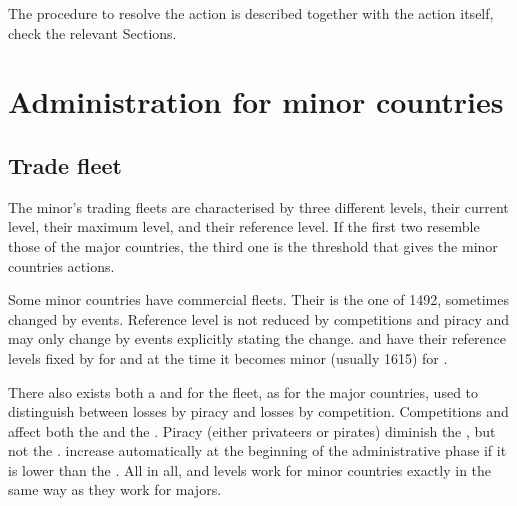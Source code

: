\aparag The procedure to resolve the action is described together with the
action itself, check the relevant Sections.

\section{Administration for minor countries}

\label{chAdministration:Administration Minor}



\subsection{Trade fleet}\label{chAdministration:Minor Commercial Fleets}

\begin{note}
  The minor's trading fleets are characterised by three different levels,
  their current level, their maximum level, and their reference level. If the
  first two resemble those of the major countries, the third one is the
  threshold that gives the minor countries \TFI actions.
\end{note}

 Some minor countries have commercial
fleets. Their  is the one of 1492, sometimes changed by
events. Reference level is not reduced by competitions and piracy and may only
change by events explicitly stating the change.
\bparag[Exception] \paysPortugal and \paysVenise have their reference levels
fixed by  for \paysPortugal and at the time
it becomes minor (usually 1615) for \paysVenise.

\aparag There also exists both a  and  for the fleet, as for the major countries, used to distinguish
between losses by piracy and losses by competition.
\bparag Competitions and \TFI affect both the  and the
.
\bparag Piracy (either privateers or pirates) diminish the , but not the .
\bparag {} increase automatically at the beginning of the
administrative phase if it is lower than the .
\bparag All in all,  and  levels work for minor
countries exactly in the same way as they work for majors.

